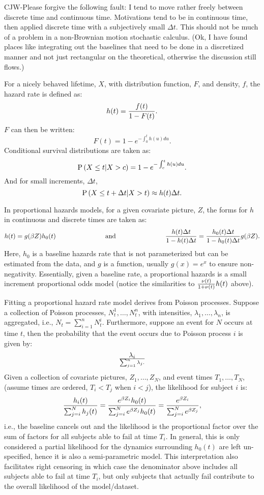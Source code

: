 \documentclass[10pt]{article}
\begin{document}
CJW-Please forgive the following fault: I tend to move rather freely between discrete time and continuous time.  Motivations tend to be in continuous time, 
then applied discrete time with a subjectively small $\Delta t$.  This should not be much of a problem in a non-Brownian motion stochastic calculus.
(Ok, I have found places like integrating out the baselines that need to be done in a discretized manner and not just rectangular on the theoretical, 
otherwise the discussion still flows.)

For a nicely behaved lifetime, $X$, with distribution function, $F$, and density, $f$, the hazard rate is defined as:
$$h(t)={f(t)\over 1-F(t)}.$$
$F$ can then be written:
$$F(t)=1-e^{-\int_0^th(u)du}.$$
Conditional survival distributions are taken as:
$$\text{P}\left({X \le t | X > c}\right)=1-e^{-\int_c^th(u)du}.$$
And for small increments, $\Delta t$,
$$\text{P}\left({X \le t+\Delta t | X>t}\right) \approx h(t)\Delta t.$$
 
In proportional hazards models, for a given covariate picture, $Z$, the forms for $h$ in continuous and discrete times are taken as:
$$h(t)=g(\beta Z)h_0(t)   \hspace{1in} \text{ and }   \hspace{1in}  {h(t)\Delta t \over 1-h(t)\Delta t }={h_0(t)\Delta t \over 1-h_0(t)\Delta t }g(\beta Z).$$
Here, $h_0$ is a baseline hazards rate that is not parameterized but can be estimated from the data, and $g$ is a function, usually $g(x)=e^x$ to 
ensure non-negativity.
Essentially, given a baseline rate, a proportional hazards is a small increment proportional odds model (notice the similarities to ${\nu(t)\over 1+\nu(t)}h(t)$ above).
 
Fitting a proportional hazard rate model derives from Poisson processes.  Suppose a collection of Poisson processes, $N^1_t, \ldots, N^n_t$, with intensities,
$\lambda_1, \ldots, \lambda_n$, is aggregated, i.e., $N_t=\sum_{i=1}^n N^i_t$.  Furthermore, suppose an event for $N$ occurs at time $t$, then the probability
that the event occurs due to Poisson process $i$ is given by:
$$\lambda_i \over \sum_{j=1}^n \lambda_j.$$
Given a collection of covariate pictures, $Z_1, \ldots, Z_N$, and event times $T_1, \ldots, T_N$, (assume times are ordered, $T_i<T_j$ when $i<j$), 
the likelihood for subject $i$ is:
$$ { h_i(t) \over \sum_{j=i}^N h_j(t) } = {e^{\beta Z_i}h_0(t) \over \sum_{j=i}^N e^{\beta Z_j}h_0(t)}= {e^{\beta Z_i} \over \sum_{j=i}^N e^{\beta Z_j}},$$
i.e., the baseline cancels out and the likelihood is the proportional factor over the sum of factors for all subjects able to fail at time $T_i$.
In general, this is only considered a partial likelihood for the dynamics surrounding $h_0(t)$ are left un-specified, hence it is also a semi-parametric model.
This interpretation also facilitates right censoring in which case the denominator above includes all subjects able to fail at time $T_i$, but only
subjects that actually fail contribute to the overall likelihood of the model/dataset.
 
\end{document}
